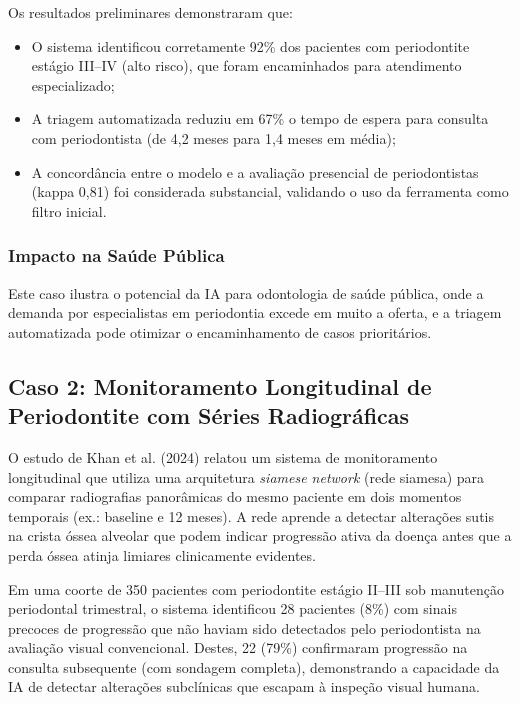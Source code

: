Os resultados preliminares demonstraram que:
\begin{itemize}
    \item O sistema identificou corretamente 92\% dos pacientes com periodontite estágio III--IV (alto risco), que foram encaminhados para atendimento especializado;
    \item A triagem automatizada reduziu em 67\% o tempo de espera para consulta com periodontista (de 4,2 meses para 1,4 meses em média);
    \item A concordância entre o modelo e a avaliação presencial de periodontistas (kappa 0,81) foi considerada substancial, validando o uso da ferramenta como filtro inicial.
\end{itemize}

\subsubsection{Impacto na Saúde Pública}

Este caso ilustra o potencial da IA para odontologia de saúde pública, onde a demanda por especialistas em periodontia excede em muito a oferta, e a triagem automatizada pode otimizar o encaminhamento de casos prioritários.

\subsection{Caso 2: Monitoramento Longitudinal de Periodontite com Séries Radiográficas}

O estudo de Khan et al. (2024) relatou um sistema de monitoramento longitudinal que utiliza uma arquitetura \textit{siamese network} (rede siamesa) para comparar radiografias panorâmicas do mesmo paciente em dois momentos temporais (ex.: baseline e 12 meses). A rede aprende a detectar alterações sutis na crista óssea alveolar que podem indicar progressão ativa da doença antes que a perda óssea atinja limiares clinicamente evidentes.

Em uma coorte de 350 pacientes com periodontite estágio II--III sob manutenção periodontal trimestral, o sistema identificou 28 pacientes (8\%) com sinais precoces de progressão que não haviam sido detectados pelo periodontista na avaliação visual convencional. Destes, 22 (79\%) confirmaram progressão na consulta subsequente (com sondagem completa), demonstrando a capacidade da IA de detectar alterações subclínicas que escapam à inspeção visual humana.

